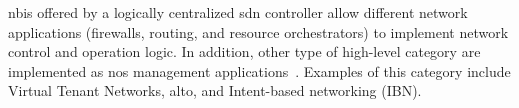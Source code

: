 \glspl{nbi} offered by a logically centralized \gls{sdn} controller allow different network applications (firewalls, routing, and resource orchestrators) to implement network control and operation logic. In addition, other type of high-level  category are implemented as \gls{nos} management applications~\cite{Rotsos2017NetworkSurvey}. Examples of this category include Virtual Tenant Networks, \gls{alto}, and Intent-based networking (IBN).






